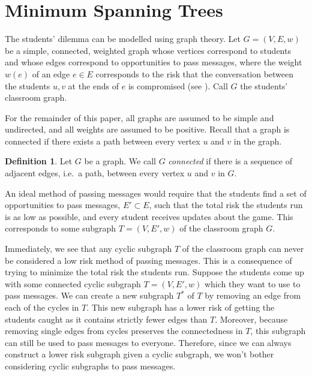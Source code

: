 \documentclass[a4paper,11pt]{report}
\theoremstyle{plain}
\theoremstyle{definition}
\newtheorem{defn}[thm]{Definition}
\begin{document}
\section{Minimum Spanning Trees}

The students' dilemma can be modelled using graph theory. Let $G = (V, E, w)$
be a simple, connected, weighted graph whose vertices correspond to students
and whose edges correspond to opportunities to pass messages, where the weight
$w(e)$ of an edge $e \in E$ corresponds to the risk that the conversation
between the students $u,v$ at the ends of $e$ is compromised (see
). Call $G$ the students' classroom graph.



For the remainder of this paper, all graphs are assumed to be simple and
undirected, and all weights are assumed to be positive. Recall that a graph is
connected if there exists a path between every vertex $u$ and $v$ in the graph.

\begin{defn}
Let $G$ be a graph. We call $G$ \emph{connected} if there is
a sequence of adjacent edges, i.e.~a path,  between every vertex $u$ and $v$
in $G$.
\end{defn}

An ideal method of passing messages would require that the students find
a set of opportunities to pass messages, $E' \subset E$, such that the total
risk the students run is as low as possible, and every student receives
updates about the game. This corresponds to some subgraph $T = (V, E', w)$
of the classroom graph $G$.


Immediately, we see that any cyclic subgraph $T$ of the classroom graph can
never be considered a low risk method of passing messages. This is a
consequence of trying to minimize the total risk the students run. Suppose the
students come up with some connected cyclic subgraph $T = (V, E', w)$ which
they want to use to pass messages. We can create a new subgraph $T^*$ of $T$ by
removing an edge from each of the cycles in $T$. This new subgraph has a lower
risk of getting the students caught as it contains strictly fewer edges than
$T$.  Moreover, because removing single edges from cycles preserves the
connectedness in $T$, this subgraph can still be used to pass messages to
everyone. Therefore, since we can always construct a lower risk subgraph given
a cyclic subgraph, we won't bother considering cyclic subgraphs to pass
messages.
\end{document}
